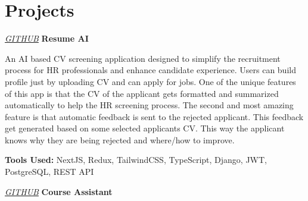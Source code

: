 \section{Projects}

    \begin{twocolentry}{
    \textit{\href{https://github.com/ehsan18t/resume-ai}{GITHUB}}}
        \textbf{Resume AI}
    \end{twocolentry}

    \begin{onecolentry}
        \begin{highlights}
            \item An AI based CV screening application designed to simplify the recruitment process for HR professionals and enhance candidate experience. Users can build profile just by uploading CV and can apply for jobs. One of the unique features of this app is that the CV of the applicant gets formatted and summarized automatically to help the HR screening process. The second and most amazing feature is that automatic feedback is sent to the rejected applicant. This feedback get generated based on some selected applicants CV. This way the applicant knows why they are being rejected and where/how to improve.
            \vspace{0.1 cm}
            \item \textbf{Tools Used:} NextJS, Redux, TailwindCSS, TypeScript, Django, JWT, PostgreSQL, REST API
        \end{highlights}
    \end{onecolentry}


    \vspace{0.2 cm}

    \begin{twocolentry}{
    \textit{\href{https://github.com/ehsan18t/CourseAssistant}{GITHUB}}}
        \textbf{Course Assistant}
    \end{twocolentry}

